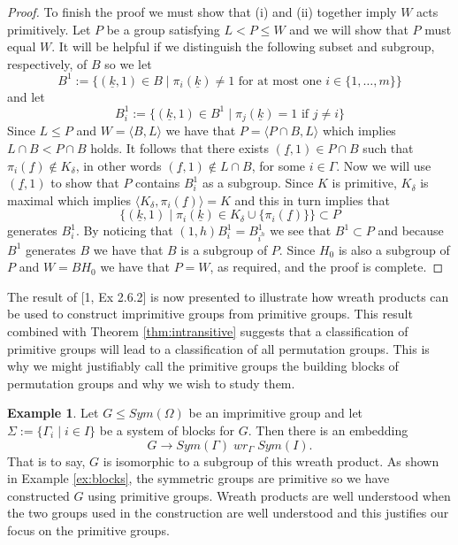 \documentclass[]{article}
\theoremstyle{definition}
\newtheorem{example}[thm]{Example}
\begin{document}
\begin{proof}
	
	To finish the proof we must show that (i) and (ii) together imply $W$ acts primitively. Let $P$ be a group satisfying $L < P \leqslant W$ and we will show that $P$ must equal $W$. It will be helpful if we distinguish the following subset and subgroup, respectively, of $B$ so we let $$B^1 := \{(\underline{k},1) \in B \; | \; \pi_i(\underline{k}) \neq 1 \mbox{ for at most one } i \in \{1, \dots, m\} \}$$ 
	and let $$B^1_i:=\{(\underline{k},1) \in B^1 \; | \; \pi_j(\underline{k}) = 1 \mbox{ if } j \neq i \}$$
	Since $L \leq P$ and $W=\langle B,L \rangle$ we have that $P=\langle P \cap B,L \rangle$ which implies $L \cap B < P \cap B$ holds. It follows that there exists $(\underline{f},1) \in P \cap B$ such that $\pi_i(\underline{f}) \notin K_\delta$, in other words $(\underline{f},1) \notin L \cap B$, for some $i \in \Gamma$. Now we will use $(\underline{f},1)$ to show that $P$ contains $B^1_i$ as a subgroup. Since $K$ is primitive, $K_\delta$ is maximal which implies $\langle K_\delta, \pi_i(\underline{f}) \rangle = K$ and this in turn implies that $$\{(\underline{k},1) \; | \; \pi_i(\underline{k}) \in K_\delta \cup \{\pi_i(\underline{f})\} \} \subset P$$
	generates $B^1_i$. By noticing that $(1,h)B^1_i = B^1_{i^h}$ we see that $B^1 \subset P$ and because $B^1$ generates $B$ we have that $B$ is a subgroup of $P$. Since $H_0$ is also a subgroup of $P$ and $W=BH_0$ we have that $P = W$, as required, and the proof is complete.
\end{proof}
	
The result of [1, Ex 2.6.2] is now presented to illustrate how wreath products can be used to construct imprimitive groups from primitive groups. This result combined with Theorem \ref{thm:intransitive} suggests that a classification of primitive groups will lead to a classification of all permutation groups. This is why we might justifiably call the primitive groups the building blocks of permutation groups and why we wish to study them.

\begin{example} \label{ex:imprimitivewreath}
Let $G \leqslant Sym(\Omega)$ be an imprimitive group and let $\Sigma:=\{\Gamma_i \; | \; i \in I \}$ be a system of blocks for $G$. Then there is an embedding $$G \rightarrow Sym(\Gamma) \; wr_\Gamma \; Sym(I).$$ That is to say, $G$ is isomorphic to a subgroup of this wreath product. As shown in Example \ref{ex:blocks}, the symmetric groups are primitive so we have constructed $G$ using primitive groups. Wreath products are well understood when the two groups used in the construction are well understood and this justifies our focus on the primitive groups.
\end{example}
\clearpage
\end{document}
